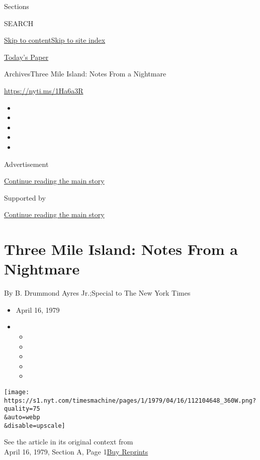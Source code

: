 Sections

SEARCH

\protect\hyperlink{site-content}{Skip to
content}\protect\hyperlink{site-index}{Skip to site index}

\href{https://myaccount.nytimes.com/auth/login?response_type=cookie\&client_id=vi}{}

\href{https://www.nytimes.com/section/todayspaper}{Today's Paper}

Archives\textbar{}Three Mile Island: Notes From a Nightmare

\url{https://nyti.ms/1Ha6a3R}

\begin{itemize}
\item
\item
\item
\item
\item
\end{itemize}

Advertisement

\protect\hyperlink{after-top}{Continue reading the main story}

Supported by

\protect\hyperlink{after-sponsor}{Continue reading the main story}

\hypertarget{three-mile-island-notes-from-a-nightmare}{%
\section{Three Mile Island: Notes From a
Nightmare}\label{three-mile-island-notes-from-a-nightmare}}

By B. Drummond Ayres Jr.;Special to The New York Times

\begin{itemize}
\item
  April 16, 1979
\item
  \begin{itemize}
  \item
  \item
  \item
  \item
  \item
  \end{itemize}
\end{itemize}

\texttt{[image: https://s1.nyt.com/timesmachine/pages/1/1979/04/16/112104648\_360W.png?quality=75\\\&auto=webp\\\&disable=upscale]}

See the article in its original context from\\
April 16, 1979, Section A, Page
1\href{https://store.nytimes.com/collections/new-york-times-page-reprints?utm_source=nytimes\&utm_medium=article-page\&utm_campaign=reprints}{Buy
Reprints}

